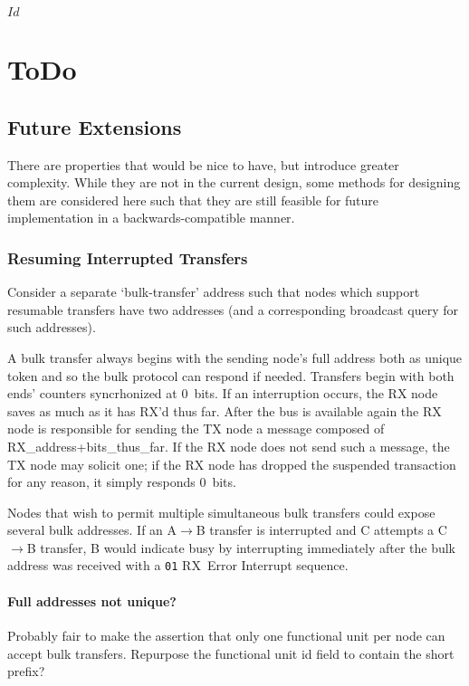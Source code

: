 \svnInfo $Id$

\section{ToDo}
\label{sec:todo}

\subsection{Future Extensions}
\label{sec:todo-extensions}
There are properties that would be nice to have, but introduce greater
complexity. While they are not in the current design, some methods for
designing them are considered here such that they are still feasible for
future implementation in a backwards-compatible manner.

\subsubsection{Resuming Interrupted Transfers}
\label{sec:todo-extensions-resume}
Consider a separate `bulk-transfer' address such that nodes which support
resumable transfers have two addresses (and a corresponding broadcast query
for such addresses).

A bulk transfer always begins with the sending node's full address both as
unique token and so the bulk protocol can respond if needed. Transfers begin
with both ends' counters syncrhonized at 0~bits. If an interruption occurs,
the RX node saves as much as it has RX'd thus far. After the bus is available
again the RX node is responsible for sending the TX node a message composed of
RX\_address+bits\_thus\_far. If the RX node does not send such a message, the
TX node may solicit one; if the RX node has dropped the suspended transaction
for any reason, it simply responds 0~bits.

Nodes that wish to permit multiple simultaneous bulk transfers could expose
several bulk addresses. If an A$\rightarrow$B transfer is interrupted and C
attempts a C$\rightarrow$B transfer, B would indicate busy by interrupting
immediately after the bulk address was received with a {\tt 01} RX~Error
Interrupt sequence.

\paragraph{Full addresses not unique?} Probably fair to make the assertion
that only one functional unit per node can accept bulk transfers. Repurpose
the functional unit id field to contain the short prefix?
